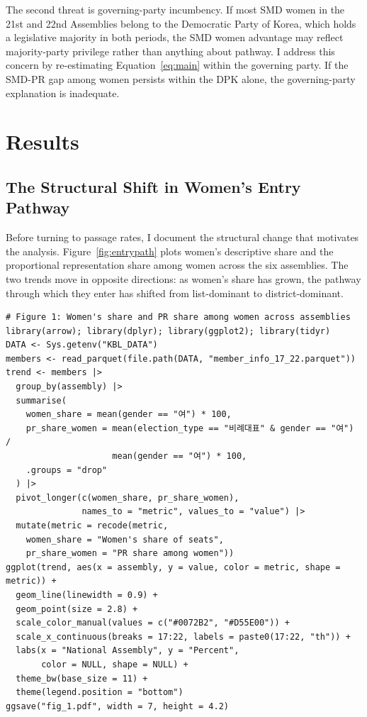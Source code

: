 \documentclass[11pt]{article}
\begin{document}
The second threat is governing-party incumbency. If most SMD women in the 21st and 22nd Assemblies belong to the Democratic Party of Korea, which holds a legislative majority in both periods, the SMD women advantage may reflect majority-party privilege rather than anything about pathway. I address this concern by re-estimating Equation~\ref{eq:main} within the governing party. If the SMD-PR gap among women persists within the DPK alone, the governing-party explanation is inadequate.

\section{Results}

\subsection{The Structural Shift in Women's Entry Pathway}

Before turning to passage rates, I document the structural change that motivates the analysis. Figure~\ref{fig:entrypath} plots women's descriptive share and the proportional representation share among women across the six assemblies. The two trends move in opposite directions: as women's share has grown, the pathway through which they enter has shifted from list-dominant to district-dominant.

\begin{verbatim}
# Figure 1: Women's share and PR share among women across assemblies
library(arrow); library(dplyr); library(ggplot2); library(tidyr)
DATA <- Sys.getenv("KBL_DATA")
members <- read_parquet(file.path(DATA, "member_info_17_22.parquet"))
trend <- members |>
  group_by(assembly) |>
  summarise(
    women_share = mean(gender == "여") * 100,
    pr_share_women = mean(election_type == "비례대표" & gender == "여") /
                     mean(gender == "여") * 100,
    .groups = "drop"
  ) |>
  pivot_longer(c(women_share, pr_share_women),
               names_to = "metric", values_to = "value") |>
  mutate(metric = recode(metric,
    women_share = "Women's share of seats",
    pr_share_women = "PR share among women"))
ggplot(trend, aes(x = assembly, y = value, color = metric, shape = metric)) +
  geom_line(linewidth = 0.9) +
  geom_point(size = 2.8) +
  scale_color_manual(values = c("#0072B2", "#D55E00")) +
  scale_x_continuous(breaks = 17:22, labels = paste0(17:22, "th")) +
  labs(x = "National Assembly", y = "Percent",
       color = NULL, shape = NULL) +
  theme_bw(base_size = 11) +
  theme(legend.position = "bottom")
ggsave("fig_1.pdf", width = 7, height = 4.2)
\end{verbatim}
\end{document}
